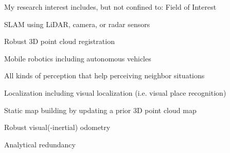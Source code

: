 \begin{cvparagraph}
\cventry
  {My research interest includes, but not confined to:} %
  {Field of Interest}%
  {} %
  {} %
  {
    \begin{cvitems} %
      \item {SLAM using LiDAR, camera, or radar sensors\lineintv}
      \item {Robust 3D point cloud registration\lineintv}
      \item {Mobile robotics including autonomous vehicles\lineintv}
      \item {All kinds of perception that help perceiving neighbor situations\lineintv}
      \item {Localization including visual localization (i.e. visual place recognition)\lineintv}
      \item {Static map building by updating a prior 3D point cloud map\lineintv}
      \item {Robust visual(-inertial) odometry\lineintv}
      \item {Analytical redundancy\lineintv}
    \end{cvitems}
  }

\end{cvparagraph}
